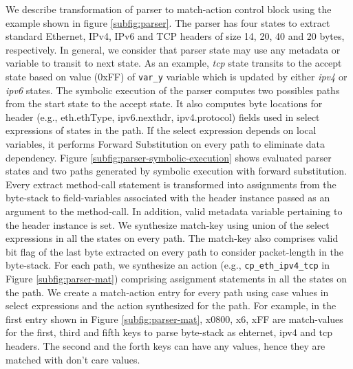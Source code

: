 We describe transformation of parser to match-action control block using the example shown in figure \ref{subfig:parser}.
The parser has four states to extract standard Ethernet, IPv4, IPv6 and TCP headers of size 14, 20, 40 and 20 bytes, respectively.
In general, we consider that parser state may use any metadata or variable to transit to next state. 
As an example, \emph{tcp} state transits to the accept state based on value (0xFF) of \texttt{var\_y} variable which is updated by either \emph{ipv4} or \emph{ipv6} states.
The symbolic execution of the parser computes two possibles paths from the start state to the accept state.
It also computes byte locations for header (e.g., eth.ethType, ipv6.nexthdr, ipv4.protocol) fields used in select expressions of states in the path.
If the select expression depends on local variables, it performs Forward Substitution \cite{Padua:1986:ACO:7902.7904} on every path to eliminate data dependency.
Figure \ref{subfig:parser-symbolic-execution} shows evaluated parser states and two paths generated by symbolic execution with forward substitution.
Every extract method-call statement is transformed into assignments from the byte-stack to field-variables associated with the header instance passed as an argument to the method-call.
In addition, valid metadata variable pertaining to the header instance is set.
We synthesize match-key using union of the select expressions in all the states on every path.
The match-key also comprises valid bit flag of the last byte extracted on every path to consider packet-length in the byte-stack.
For each path, we synthesize an action (e.g., \texttt{cp\_eth\_ipv4\_tcp} in Figure \ref{subfig:parser-mat}) comprising assignment statements in all the states on the path.
We create a match-action entry for every path using case values in select expressions and the action synthesized for the path.
For example, in the first entry shown in Figure \ref{subfig:parser-mat}, x0800, x6, xFF are match-values for the first, third and fifth keys to parse byte-stack as ehternet, ipv4 and tcp headers.
The second and the forth keys can have any values, hence they are matched with don't care values.





